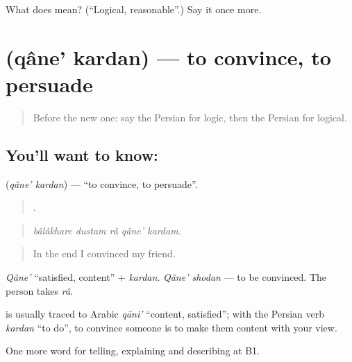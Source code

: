 \begin{tcolorbox}[breakable,colback=teal!4,colframe=teal!35!black,title={Before you move on}]
What does  mean? (\textquotedblleft{}Logical, reasonable\textquotedblright{}.) Say it once more.
\end{tcolorbox}
\section[\texorpdfstring{\fa{قانع} \fa{کردن} (qâne' kardan)}{قانع کردن (qâne' kardan)}]{  (qâne' kardan) — to convince, to persuade}

\label{lesson:FA-C362-qane-kardan}



\begin{quote}
Before the new one: say the Persian for logic, then the Persian for logical.
\end{quote}

\subsection*{You'll want to know:  }
\textbf{ } (\emph{qâne' kardan}) — \textquotedblleft{}to convince, to persuade\textquotedblright{}.

\begin{quote}
    .
\end{quote}

\begin{quote}
\emph{bâlâkhare dustam râ qâne' kardam.}
\end{quote}

\begin{quote}
In the end I convinced my friend.
\end{quote}

\emph{Qâne'} \textquotedblleft{}satisfied, content\textquotedblright{} + \emph{kardan}. \emph{Qâne' shodan} — to be convinced. The person takes \emph{râ}.

\begin{cousinweb}
\textbf{} is usually traced to Arabic \emph{qāni'} \textquotedblleft{}content, satisfied\textquotedblright{}; with the Persian verb \emph{kardan} \textquotedblleft{}to do\textquotedblright{}, to convince someone is to make them content with your view.
\end{cousinweb}

\begin{grammarlens}[title={What you've built}]
One more word for telling, explaining and describing at B1.
\end{grammarlens}

